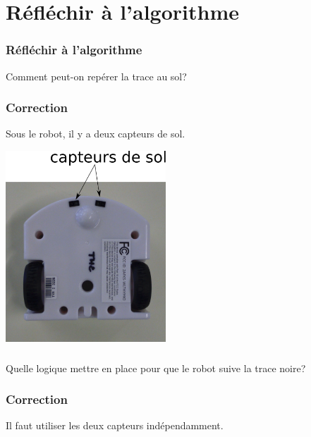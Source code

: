 \documentclass[svgnames,11pt]{beamer}
\begin{document}
\section{Réfléchir à l'algorithme}
\begin{frame}
    \frametitle{Réfléchir à l'algorithme}
    
\begin{aretenir}[Question]
Comment peut-on repérer la trace au sol?
\end{aretenir}
    

\end{frame}
\begin{frame}
    \frametitle{Correction}

    Sous le robot, il y a deux capteurs de sol.
    \begin{center}
    \centering
    \includegraphics[width=6cm]{ressources/capteurs-sol.png}
    \label{capteurs}
    \end{center}

\end{frame}
\begin{frame}
    \frametitle{}

    \begin{aretenir}[Question]
    Quelle logique mettre en place pour que le robot suive la trace noire?
    \end{aretenir}

\end{frame}
\begin{frame}
    \frametitle{Correction}

    Il faut utiliser les deux capteurs indépendamment.

\end{frame}
\end{document}
